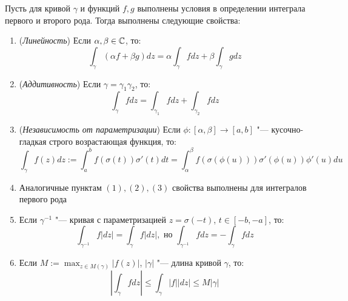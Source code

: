 \begin{theorem}
	Пусть для кривой $\gamma$ и функций $f, g$ выполнены условия в определении интеграла первого и второго рода. Тогда выполнены следующие свойства:
	\begin{enumerate}
		\item (\textit{Линейность}) Если $\alpha, \beta \in \mathbb{C}$, то:
		\[\int_{\gamma}(\alpha f+\beta g)dz = \alpha\int_\gamma fdz + \beta\int_\gamma gdz\]
		
		\item (\textit{Аддитивность}) Если $\gamma = \gamma_1\gamma_2$, то:
		\[\int_{\gamma}fdz = \int_{\gamma_1}fdz + \int_{\gamma_2}fdz\]
		
		\item (\textit{Независимость от параметризации}) Если $\phi : [\alpha, \beta] \to [a, b]$ "--- кусочно-гладкая строго возрастающая функция, то:
		\[\int_{\gamma}f(z)dz := \int_a^bf(\sigma(t))\sigma'(t)dt = \int_\alpha^\beta f(\sigma(\phi(u)))\sigma'(\phi(u))\phi'(u)du\]
		
		\item Аналогичные пунктам $(1), (2), (3)$ свойства выполнены для интегралов первого рода
		
		\item Если $\gamma^{-1}$ "--- кривая с параметризацией $z = \sigma(-t)$, $t \in [-b, -a]$, то:
		\[\int_{\gamma^{-1}}f|dz| = \int_\gamma f|dz|,\text{ но }\int_{\gamma^{-1}}fdz = -\int_\gamma fdz\]
		
		\item Если $M := \max_{z \in M(\gamma)}|f(z)|$, $|\gamma|$ "--- длина кривой $\gamma$, то:
		\[\left|\int_\gamma fdz\right| \le \int_\gamma|f||dz| \le M|\gamma|\]
	\end{enumerate}
\end{theorem}